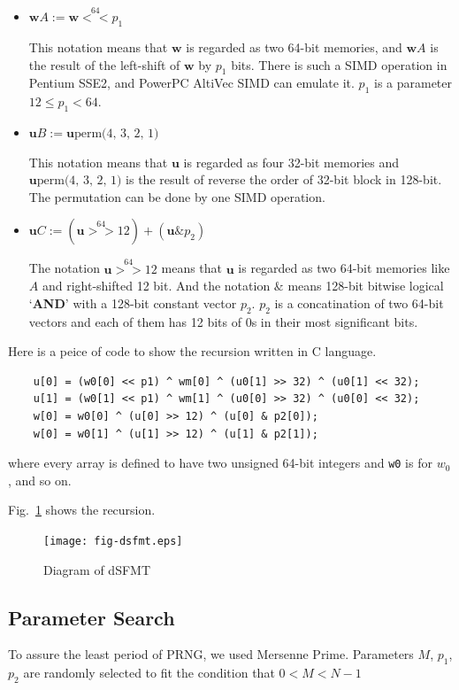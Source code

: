 \documentclass{svmult}
\begin{document}
\begin{itemize}
\item 
  $\mathbf{w} A := \mathbf{w} \stackrel{64}{<<} p_1$

  This notation means that $\mathbf{w}$ is regarded as two 
  64-bit memories, and $\mathbf{w} A$ is the result of the left-shift
  of $\mathbf{w}$ by $p_1$ bits. There is such a SIMD operation in 
  Pentium SSE2, and PowerPC AltiVec SIMD can emulate it.
  $p_1$ is a parameter $12 \le p_1 < 64$.

\item
  $\mathbf{u} B := \mathbf{u}\textrm{perm(4, 3, 2, 1)}$

  This notation means that $\mathbf{u}$ is regarded as four
  32-bit memories and $\mathbf{u}\textrm{perm(4, 3, 2, 1)}$ is
  the result of reverse the order of 32-bit block in 128-bit.
  The permutation can be done by one SIMD operation.

\item 
  $\mathbf{u} C := (\mathbf{u} \stackrel{64}{>>} 12) 
  + (\mathbf{u} \& p_2)$

  The notation $\mathbf{u} \stackrel{64}{>>} 12$ means that
  $\mathbf{u}$ is regarded as two 64-bit memories like $A$ and
  right-shifted 12 bit.  And the notation $\&$ means 128-bit
  bitwise logical `\textbf{AND}' with a 128-bit constant vector $p_2$.
  $p_2$ is a concatination of two 64-bit vectors and each of them has
  12 bits of 0s in their most significant bits.

\end{itemize}
Here is a peice of code to show the recursion written in C language.
\begin{verbatim}
    u[0] = (w0[0] << p1) ^ wm[0] ^ (u0[1] >> 32) ^ (u0[1] << 32);
    u[1] = (w0[1] << p1) ^ wm[1] ^ (u0[0] >> 32) ^ (u0[0] << 32);
    w[0] = w0[0] ^ (u[0] >> 12) ^ (u[0] & p2[0]);
    w[0] = w0[1] ^ (u[1] >> 12) ^ (u[1] & p2[1]);
\end{verbatim}
where every array is defined to have two unsigned 64-bit integers
and \texttt{w0} is for $w_0$, and so on.

Fig.~\ref{fig:dsfmt} shows the recursion.
\begin{figure}
\caption{Diagram of dSFMT \label{fig:dsfmt}}
\begin{center}
\texttt{[image: fig-dsfmt.eps]}
\end{center}
\end{figure}

\subsection{Parameter Search}
\label{sec:search}

To assure the least period of PRNG, we used Mersenne Prime. \cite{MT}
Parameters $M$, $p_1$, $p_2$ are randomly selected to fit the
condition that $0 < M < N - 1$
\end{document}
